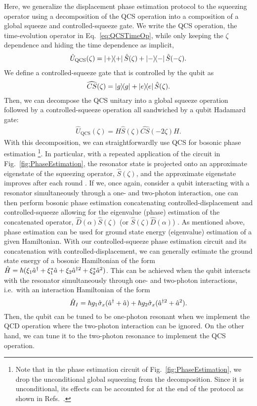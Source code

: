 {Here, we generalize the displacement phase estimation protocol \cite{PhaseEstimationTerhal1} to the squeezing operator using a decomposition of the QCS operation into a composition of a global squeeze and controlled-squeeze gate. We write the QCS operation, the time-evolution operator in Eq.~\eqref{eq:QCSTimeOp}, while only keeping the $\zeta$ dependence and hiding the time dependence as implicit,}
{\begin{align}
    \hat{U}_{\text{QCS}}(\zeta)=\dyad{+}\hat{S}(\zeta) +\dyad{-}\hat{S}(-\zeta).
\end{align}
We define a controlled-squeeze gate that is controlled by the qubit as \begin{align}
    \widehat{CS}(\zeta)=\dyad{g} + \dyad{e}\hat{S}(\zeta).
\end{align}}
{Then, we can decompose the QCS unitary into a global squeeze operation followed by a controlled-squeeze operation all sandwiched by a qubit Hadamard gate:
\begin{align}
    \hat{U}_{\text{QCS}}(\zeta)=H\hat{S}(\zeta)\widehat{CS}(-2\zeta)H.
\end{align}}{With this decomposition, we can straightforwardly use QCS for bosonic phase estimation \footnote{Note that in the phase estimation circuit of Fig.~\ref{fig:PhaseEstimation}, we drop the unconditional global squeezing from the decomposition. Since it is unconditional, its effects can be accounted for at the end of the protocol as shown in Refs.~\cite{PhaseEstimationTerhal1,PhaseEstimationTerhal2}.}. In particular, with a repeated application of the circuit in Fig.~\ref{fig:PhaseEstimation}, the resonator state is projected onto an approximate eigenstate of the squeezing operator, $\hat{S}(\zeta)$, and the approximate eigenstate improves after each round  \cite{PhaseEstimationTerhal1,PhaseEstimationTerhal2}. If we, once again, consider a qubit interacting with a resonator simultaneously through a one- and two-photon interaction, one can then perform bosonic phase estimation concatenating controlled-displacement and controlled-squeeze allowing for the eigenvalue (phase) estimation of the concatenated operator, $\hat{D}(\alpha)\hat{S}(\zeta)$ (or $\hat{S}(\zeta)\hat{D}(\alpha)$) \cite{EigenSqueeze}. As mentioned above, phase estimation can be used for ground state energy (eigenvalue) estimation of a given Hamiltonian. With our controlled-squeeze phase estimation circuit and its concatenation with controlled-displacement, we can generally estimate the ground state energy of a bosonic Hamiltonian of the form $\hat{H}= \hbar (\xi_1 \hat{a}^\dagger + \xi_1^* \hat{a} +\xi_2 \hat{a}^{\dagger 2} + \xi_2^* \hat{a}^2)$. {This can be {achieved when the} qubit interacts with the resonator simultaneously through one- and two-photon interactions, i.e.~with an interaction Hamiltonian of the form $$\hat{H}_I=\hbar g_1\hat{\sigma}_x (\hat{a}^\dagger+\hat{a}) + \hbar g_2\hat{\sigma}_x(\hat{a}^{\dagger 2} + \hat{a}^2).$$ Then, the qubit can be tuned to be one-photon resonant when we implement the QCD operation where the two-photon interaction can be ignored. On the other hand, we can tune it to the two-photon resonance to implement the QCS operation. } }



